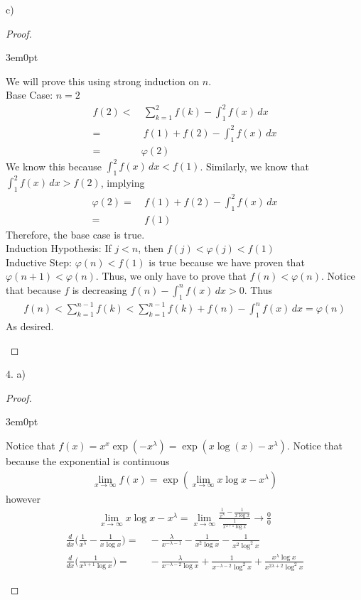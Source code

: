 \documentclass[11pt]{article}
\newcommand{\nskip}{\\ \bigskip}
\newenvironment{myproof}
{\begin{proof} \begin{adjustwidth}{3em}{0pt}$ $\par\nobreak\ignorespaces}
{\end{adjustwidth} \end{proof}}
\begin{document}
\begin{flushleft}
c)

\begin{myproof}
We will prove this using strong induction on $n$. \nskip
Base Case: $n = 2$
\begin{align*}
f(2) < & \ \sum_{k=1}^2 f(k) - \int_1^2 f(x) \,dx \\
= & \ f(1) + f(2) - \int_1^2 f(x) \,dx \\
= & \varphi (2)
\end{align*}
We know this because $\int_1^2 f(x) \,dx < f(1)$. Similarly, we know that $\int_1^2 f(x) \,dx > f(2)$, implying
\begin{align*}
\varphi (2) = & \ f(1) + f(2) - \int_1^2 f(x) \,dx \\
 = & \ f(1)
\end{align*}
Therefore, the base case is true. \nskip
Induction Hypothesis: If $j<n$, then $f(j) < \varphi (j) < f(1)$ \nskip
Inductive Step: $\varphi (n) < f(1)$ is true because we have proven that $\varphi (n+1) < \varphi (n)$. Thus, we only have to prove that $f(n) < \varphi (n)$. Notice that because $f$ is decreasing $f(n) - \int_1^n f(x) \,dx >0$. Thus 
\begin{align*}
f(n) < \sum_{k=1}^{n-1} f(k) < \sum_{k=1}^{n-1} f(k) + f(n) - \int_1^n f(x) \,dx = \varphi (n)
\end{align*}
As desired.
\end{myproof}

\newpage

4. a)

\begin{myproof}
Notice that $f(x) = x^x \exp(-x^\lambda) = \exp(x \log (x) - x^\lambda)$. Notice that because the exponential is continuous
\begin{align*}
\lim_{x \to \infty} f(x) = \exp ( \lim_{x \to \infty} x \log x - x^\lambda )
\end{align*}
however
\begin{align*}
\lim_{x \to \infty} x \log x - x^\lambda = \lim_{x \to \infty} \frac{\frac{1}{x^\lambda}-\frac{1}{x \log x}}{\frac{1}{x^{\lambda+1} \log x}} \rightarrow \frac{0}{0}
\end{align*}
\begin{align*}
\frac{d}{dx}\Bigg( \frac{1}{x^\lambda}-\frac{1}{x \log x} \Bigg) = &  \ -\frac{\lambda }{x^{-\lambda -1}} - \frac{1}{x^2 \log  x} - \frac{1}{x^2 \log^2 x} \\
\frac{d}{dx} \Bigg( \frac{1}{x^{\lambda+1} \log x} \Bigg) = & \ - \frac{\lambda}{x^{-\lambda -2} \log x}+ \frac{1}{x^{-\lambda -2} \log^2 x} +  \frac{x^\lambda \log x}{x^{2\lambda+2} \log^2 x}
\end{align*}
\end{myproof}


\end{flushleft}
\end{document}
